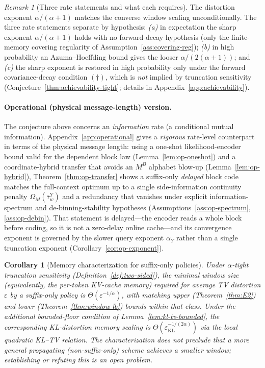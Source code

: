 \documentclass[11pt]{article}
\newcommand{\KLs}{\mathrm{KL}}
\theoremstyle{plain}
\newtheorem{corollary}[theorem]{Corollary}
\theoremstyle{definition}
\theoremstyle{remark}
\newtheorem{remark}[theorem]{Remark}
\begin{document}
\begin{remark}[Three rate statements and what each requires]
\label{rmk:exponent-gap}
The distortion exponent $\alpha/(\alpha+1)$ matches the converse
window scaling unconditionally. The three rate statements separate by
hypothesis: \emph{(a)} in expectation the sharp exponent
$\alpha/(\alpha+1)$ holds with no forward-decay hypothesis (only the
finite-memory covering regularity of
Assumption~\ref{ass:covering-reg}); \emph{(b)} in high probability
an Azuma--Hoeffding bound gives the looser
$\alpha/(2(\alpha+1))$; and \emph{(c)} the sharp exponent is restored
in high probability only under the forward covariance-decay condition
$(\dagger)$, which is \emph{not} implied by truncation sensitivity
(Conjecture~\ref{thm:achievability-tight}; details in
Appendix~\ref{app:achievability}).
\end{remark}

\paragraph{Operational (physical message-length) version.}
The conjecture above concerns an \emph{information} rate (a
conditional mutual information). Appendix~\ref{app:operational} gives
a \emph{rigorous} rate-level counterpart in terms of the physical
message length:
using a one-shot likelihood-encoder bound valid for the dependent
block law (Lemma~\ref{lem:op-oneshot}) and a coordinate-hybrid
transfer that avoids an $M^B$ alphabet blow-up
(Lemma~\ref{lem:op-hybrid}), Theorem~\ref{thm:op-transfer} shows a
suffix-only \emph{delayed} block code matches the full-context
optimum up to a single side-information continuity penalty
$\Omega_M(\bar\tau^Y_w)$ and a redundancy that vanishes under
explicit information-spectrum and de-binning-stability hypotheses
(Assumptions~\ref{ass:op-spectrum}, \ref{ass:op-debin}). That statement is delayed---the
encoder reads a whole block before coding, so it is not a zero-delay
online cache---and its convergence exponent is governed by the slower
query exponent $\alpha_Y$ rather than a single truncation exponent
(Corollary~\ref{cor:op-exponent}).

\begin{corollary}[Memory characterization for suffix-only policies]\label{cor:tight}
Under $\alpha$-tight truncation sensitivity
(Definition~\ref{def:two-sided}), the minimal window size
(equivalently, the per-token KV-cache memory) required for average
TV distortion $\varepsilon$ \emph{by a suffix-only policy} is
$\Theta(\varepsilon^{-1/\alpha})$, with matching upper
(Theorem~\ref{thm:E2}) and lower (Theorem~\ref{thm:window-lb})
bounds \emph{within that class}. Under the additional bounded-floor
condition of Lemma~\ref{lem:kl-tv-bounded}, the corresponding
KL-distortion memory scaling is
$\Theta(\varepsilon_{\KLs}^{-1/(2\alpha)})$ via the local quadratic
KL--TV relation. The
characterization does not preclude that a more general propagating
(non-suffix-only) scheme achieves a smaller window; establishing or
refuting this is an open problem.
\end{corollary}
\end{document}

